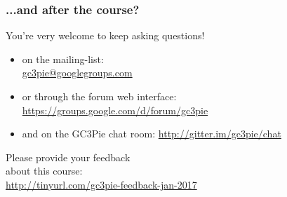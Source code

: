\documentclass[english,serif,mathserif,xcolor=pdftex,dvipsnames,table]{beamer}
\begin{document}
\begin{frame}
  \frametitle{...and after the course?}

  You're very welcome to keep asking questions!
  \begin{itemize}
  \item on the mailing-list: \\
    \href{mailto:gc3pie@googlegroups.com}{gc3pie@googlegroups.com}
  \item or through the forum web interface: {\small
      \url{https://groups.google.com/d/forum/gc3pie}}
  \item and on the GC3Pie chat room: \url{http://gitter.im/gc3pie/chat}
  \end{itemize}
\end{frame}


\begin{frame}{}
  \begin{center}
    \Large Please provide your feedback \\ about this course: \\
    \url{http://tinyurl.com/gc3pie-feedback-jan-2017}
  \end{center}
\end{frame}
\end{document}
